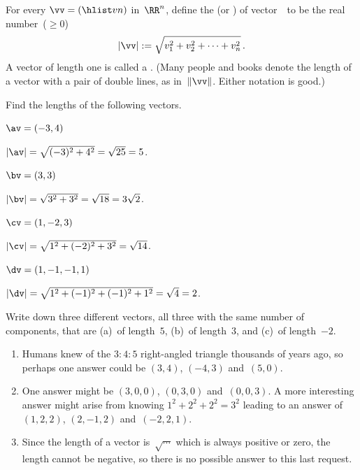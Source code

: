 \begin{definition}[Pythagoras] \label{def:veclen}
For every  \(\vv=(\hlist vn)\) in~\(\RR^n\),
define the  (or ) of vector~\vv\  to be the real number~(\(\geq0\))
\begin{equation*}
|\vv|:=\sqrt{v_1^2+v_2^2+\cdots+v_n^2}\,.
\end{equation*}
A vector of length one is called a .
(Many people and books denote the length of a vector with a pair of double lines, as in~\(\|\vv\|\).  Either notation is good.)
\end{definition}


\begin{example} \label{eg:}
Find the lengths of the following vectors.
\begin{parts}
\item \(\av=(-3,4)\)
\begin{solution} 
\(|\av|=\sqrt{(-3)^2+4^2}=\sqrt{25}=5\). 
\end{solution}

\item \(\bv=(3,3)\)
\begin{solution} 
\(|\bv|=\sqrt{3^2+3^2}=\sqrt{18}=3\sqrt2\). 
\end{solution}


\item \(\cv=(1,-2,3)\)
\begin{solution} 
\(|\cv|=\sqrt{1^2+(-2)^2+3^2}=\sqrt{14}\). 
\end{solution}

\item \(\dv=(1,-1,-1,1)\)
\begin{solution} 
\(|\dv|=\sqrt{1^2+(-1)^2+(-1)^2+1^2}=\sqrt4=2\).
\end{solution}
\end{parts}
\end{example}

\begin{example} \label{eg:}
Write down three different vectors, all three with the same number of components, that are (a)~of length~\(5\), (b)~of length~\(3\), and (c)~of length~\(-2\).
\begin{solution} 
\begin{enumerate}
\item Humans knew of the \(3:4:5\) right-angled triangle thousands of years ago, so perhaps one answer could be \((3,4)\), \((-4,3)\) and~\((5,0)\).
\item One answer might be \((3,0,0)\), \((0,3,0)\) and~\((0,0,3)\). 
A more interesting answer might arise from knowing \(1^2+2^2+2^2=3^2\) leading to an answer of \((1,2,2)\), \((2,-1,2)\) and~\((-2,2,1)\).
\item Since the length of a vector is~\(\sqrt{\cdots}\) which is always positive or zero, the length cannot be negative, so there is no possible answer to this last request.
\end{enumerate}
 
\end{solution}
\end{example}




